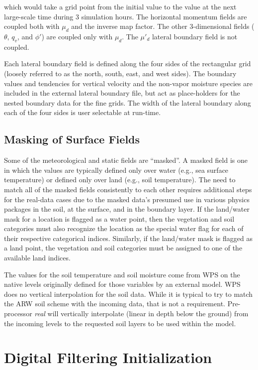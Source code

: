 \noindent which would take a grid point from the initial value to the value at the next large-scale time 
during 3 simulation hours.
The horizontal momentum fields are coupled both with  $\mu_d$ and the inverse map factor.  The 
other 3-dimensional fields ($\theta$, $q_v$, and $\phi'$) are coupled only with $\mu_d$.
The $\mu'_d$ lateral boundary field is not coupled.

Each lateral boundary field
is defined along the four sides of the 
rectangular grid (loosely referred to as the north, south, east, and west sides).  
The boundary values and tendencies for vertical velocity and the non-vapor moisture species are included
in the external lateral boundary file, but act as
place-holders for the nested boundary data for the fine grids.
The width of the lateral
boundary along each of the four sides is user selectable at run-time.

\subsection{Masking of Surface Fields}

Some of the meteorological and static fields are ``masked''.  A masked field is one in which
the values are typically defined only over water (e.g., sea surface temperature) or defined
only over land (e.g., soil temperature).
The need to match all of the masked fields consistently to each other requires additional steps
for the real-data cases due to the masked data's presumed use in various physics packages in the soil, 
at the surface, and in the boundary layer.
If the land/water
mask for a location is flagged as a water point, then the vegetation and soil categories must also
recognize the location as the special water flag for each of their respective categorical indices.  
Similarly, if the land/water mask is flagged as a land point, the vegetation and soil
categories must be assigned to one of the available land indices.

The values for the soil temperature and soil moisture come from WPS on the 
native levels originally defined for those variables
by an external model.  WPS does no vertical interpolation for the
soil data.   While it is typical to try to match the ARW soil scheme with
the incoming data, that is not a requirement.  Pre-processor {\it real} will vertically interpolate 
(linear in depth below the ground) from the incoming levels to the requested soil layers to be
used within the model.

\section{Digital Filtering Initialization}

